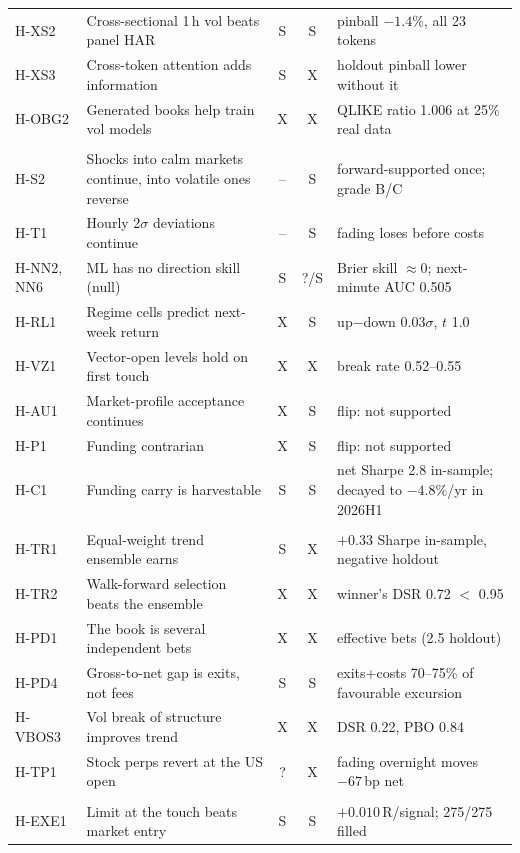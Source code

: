 \documentclass[10pt,a4paper]{article}
\begin{document}
{\begin{longtable}{@{}>{\raggedright\arraybackslash}p{1.55cm}>{\raggedright\arraybackslash}p{6.1cm}cc>{\raggedright\arraybackslash}p{5.3cm}@{}}
H-XS2 & Cross-sectional 1\,h vol beats panel HAR & S & S & pinball $-1.4\%$, all 23 tokens \\
H-XS3 & Cross-token attention adds information & S & X & holdout pinball lower without it \\
H-OBG2 & Generated books help train vol models & X & X & QLIKE ratio 1.006 at 25\% real data \\
\multicolumn{5}{@{}l}{\emph{Direction and price signals}}\\
H-S2 & Shocks into calm markets continue, into volatile ones reverse & -- & S & forward-supported once; grade B/C \\
H-T1 & Hourly 2$\sigma$ deviations continue & -- & S & fading loses before costs \\
H-NN2, NN6 & ML has no direction skill (null) & S & ?/S & Brier skill $\approx 0$; next-minute AUC 0.505 \\
H-RL1 & Regime cells predict next-week return & X & S & up$-$down 0.03$\sigma$, $t$ 1.0 \\
H-VZ1 & Vector-open levels hold on first touch & X & X & break rate 0.52--0.55 \\
H-AU1 & Market-profile acceptance continues & X & S & flip: not supported \\
H-P1 & Funding contrarian & X & S & flip: not supported \\
H-C1 & Funding carry is harvestable & S & S & net Sharpe 2.8 in-sample; decayed to $-4.8\%$/yr in 2026H1 \\
\multicolumn{5}{@{}l}{\emph{Strategies and trend}}\\
H-TR1 & Equal-weight trend ensemble earns & S & X & $+0.33$ Sharpe in-sample, negative holdout \\
H-TR2 & Walk-forward selection beats the ensemble & X & X & winner's DSR 0.72 $<$ 0.95 \\
H-PD1 & The book is several independent bets & X & X & 1.15 effective bets (2.5 holdout) \\
H-PD4 & Gross-to-net gap is exits, not fees & S & S & exits+costs 70--75\% of favourable excursion \\
H-VBOS3 & Vol break of structure improves trend & X & X & DSR 0.22, PBO 0.84 \\
H-TP1 & Stock perps revert at the US open & ? & X & fading overnight moves $-67$\,bp net \\
\multicolumn{5}{@{}l}{\emph{Execution and market making}}\\
H-EXE1 & Limit at the touch beats market entry & S & S & $+0.010$\,R/signal; 275/275 filled \\

\end{longtable}}
\end{document}
